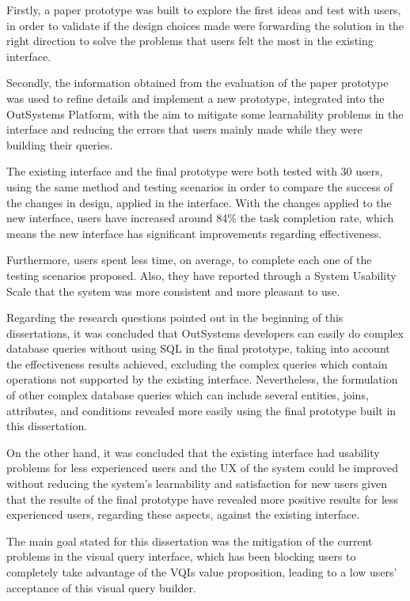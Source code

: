 Firstly, a paper prototype was built to explore the first ideas and test with users, in order to validate if the design choices made were forwarding the solution in the right direction to solve the problems that users felt the most in the existing interface.

Secondly, the information obtained from the evaluation of the paper prototype was used to refine details and implement a new prototype, integrated into the OutSystems Platform, with the aim to mitigate some learnability problems in the interface and reducing the errors that users mainly made while they were building their queries.

The existing interface and the final prototype were both tested with 30 users, using the same method and testing scenarios in order to compare the success of the changes in design, applied in the interface. With the changes applied to the new interface, users have increased around 84\% the task completion rate, which means the new interface has significant improvements regarding effectiveness.

Furthermore, users spent less time, on average, to complete each one of the testing scenarios proposed. Also, they have reported through a System Usability Scale \cite{system_usability_scale} that the system was more consistent and more pleasant to use.

Regarding the research questions pointed out in the beginning of this dissertations, it was concluded that OutSystems developers can easily do complex database queries without using SQL in the final prototype, taking into account the effectiveness results achieved, excluding the complex queries which contain operations not supported by the existing interface. Nevertheless, the formulation of other complex database queries which can include several entities, joins, attributes, and conditions revealed more easily using the final prototype built in this dissertation.

On the other hand, it was concluded that the existing interface had usability problems for less experienced users and the \gls{UX} of the system could be improved without reducing the system's learnability and satisfaction for new users given that the results of the final prototype have revealed more positive results for less experienced users, regarding these aspects, against the existing interface.

The main goal stated for this dissertation was the mitigation of the current problems in the visual query interface, which has been blocking users to completely take advantage of the \glspl{VQI} value proposition, leading to a low users' acceptance of this visual query builder.

